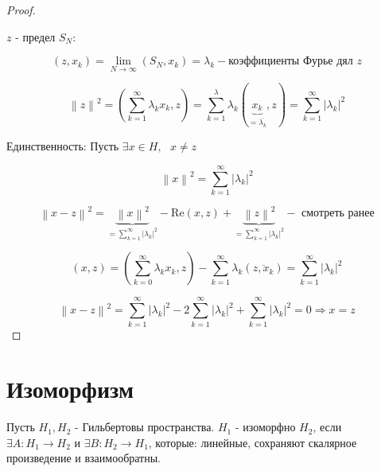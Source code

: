 \documentclass[12pt, a4paper]{report}
\begin{document}
\begin{proof}
    \[  \] 

    \( z  \)  - предел \( S_N \): 

    \[ (z , x_k ) =\lim_{N  \to \infty} (S_N , x_k )  = \lambda_k - \text{коэффициенты Фурье дял } z \] 

    \[ \left\lVert z  \right\rVert   ^2 = \left(  \sum_{k =1}^{ \infty  } \lambda_k x_k , z       \right) = \sum_{k =1}^{\lambda } \lambda_k ( \underbrace{x_k}_{=\overline{\lambda_k}  }, z ) = \sum_{k =1} ^{ \infty  } \left\lvert \lambda_k \right\rvert ^2    \] 

    Единственность: Пусть \( \exists  x \in  H , \text{ }  x \neq z  \) 

    \[ \left\lVert x   \right\rVert ^2 = \sum_{k =1}^{ \infty  } \left\lvert \lambda_k       \right\rvert ^2   \] 

    \[ \left\lVert  x - z  \right\rVert ^2 =\underbrace{ \left\lVert x \right\rVert  ^2}_{=\sum_{k =1}^{\infty  }\left\lvert \lambda_k   \right\rvert ^2  } - \mathrm{Re } (x,z )  + \underbrace{ \left\lVert z \right\rVert  ^2}_{=\sum_{k =1}^{\infty  }\left\lvert \lambda_k   \right\rvert ^2  } - \text{ смотреть ранее} \] 

    \[ (x, z ) =\left(  \sum_{k =0 }^{ \infty  } \lambda_k x_k , z   \right) - \sum _{k =1} ^{ \infty  } \lambda_k (\overline{z, x_k}  ) = \sum_{k =1}^{ \infty } \left\lvert \lambda_k      \right\rvert ^2  \]  

    \[ \left\lVert x -z  \right\rVert ^2 = \sum _{k =1}^{ \infty  } \left\lvert \lambda_k \right\rvert ^2 - 2 \sum  _{k =1}^{ \infty  } \left\lvert \lambda_k    \right\rvert ^2 + \sum _{k =1} ^{ \infty  } \left\lvert \lambda_k \right\rvert ^2 = 0 \Rightarrow x = z\] 
\end{proof}

\section{Изоморфизм}

\begin{definition}
    Пусть \( H_1, H_2 \) - Гильбертовы пространства. \( H_1  \) - изоморфно \( H_2 \), если \( \exists A : H_1 \to H_2 \) и \( \exists B : H_2 \to H_1 \), которые: линейные, сохраняют скалярное произведение и взаимообратны. 
\end{definition}


\ifdefined\mainfile
\else
\end{document}

